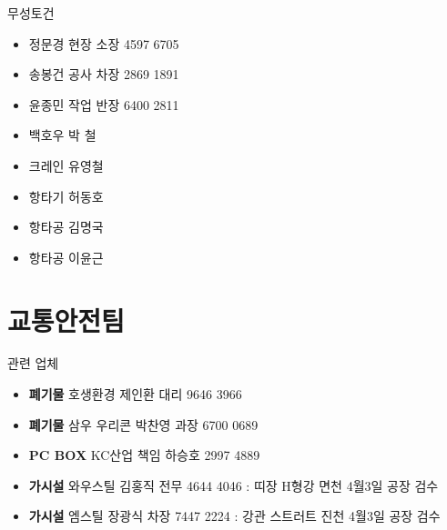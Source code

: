 \documentclass[aspectratio=1610,17pt,xcolor=pdftex,dvipsnames,table,handout]{beamer}
\begin{document}
		\begin{frame} [t,plain]
			\begin{block} {무성토건 }
			\begin{itemize}
				\item 정문경 현장 소장 4597 6705
				\item 송봉건 공사 차장 2869 1891
				\item 윤종민 작업 반장 6400 2811
				\item 백호우 박  철
				\item 크레인 유영철
				\item 항타기 허동호
				\item 항타공 김명국
				\item 항타공 이윤근
			\end{itemize}
			\end{block}
		\end{frame}


		\section{ 교통안전팀 }
		\frame [plain] {\sectionpage}


		\begin{frame} [t,plain]
			\begin{block} {관련 업체}
			\begin{itemize}
				 \setlength{\leftmargin}	{18.0em} 
				 \setlength{\labelwidth}	{18em} 
				 \setlength{\labelsep}	{1em}
				\item \textbf{폐기물} 호생환경 제인환 대리 9646 3966
				\item \textbf{폐기물} 삼우 우리콘 박찬영 과장 6700 0689
				\item \textbf{PC BOX} KC산업 책임 하승호 2997 4889
				\item \textbf{가시설} 와우스틸 김홍직 전무 4644 4046 : 띠장 H형강 면천 4월3일 공장 검수 
				\item \textbf{가시설} 엠스틸 장광식 차장 7447 2224 : 강관 스트러트 진천  4월3일 공장 검수

			\end{itemize}
			\end{block}
		\end{frame}



\end{document}
